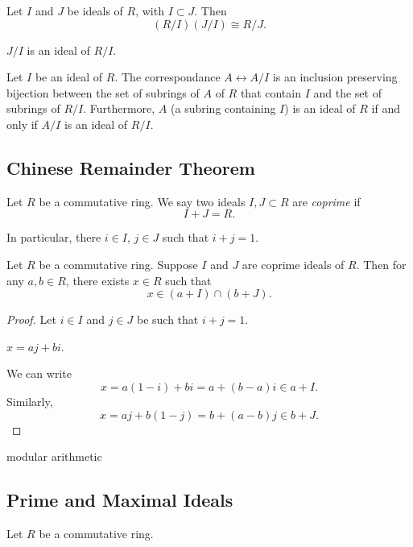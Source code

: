 \begin{theorem}
Let $I$ and $J$ be ideals of $R$, with $I\subset J$. Then
\begin{equation}
(R/I)(J/I)\cong R/J.
\end{equation}
\end{theorem}

\begin{lemma*}
$J/I$ is an ideal of $R/I$.
\end{lemma*}

\begin{theorem}
Let $I$ be an ideal of $R$. The correspondance $A\leftrightarrow A/I$ is an inclusion preserving bijection between the set of subrings of $A$ of $R$ that contain $I$ and the set of subrings of $R/I$. Furthermore, $A$ (a subring containing $I$) is an ideal of $R$ if and only if $A/I$ is an ideal of $R/I$.
\end{theorem}

\subsection{Chinese Remainder Theorem}
\begin{definition}
Let $R$ be a commutative ring. We say two ideals $I,J\subset R$ are \emph{coprime} if
\[I+J=R.\]
\end{definition}

In particular, there $i\in I$, $j\in J$ such that $i+j=1$.

\begin{theorem}
Let $R$ be a commutative ring.
Suppose $I$ and $J$ are coprime ideals of $R$. 
Then for any $a,b\in R$, there exists $x\in R$ such that
\[x\in(a+I)\cap(b+J).\]
\end{theorem}

\begin{proof}
Let $i\in I$ and $j\in J$ be such that $i+j=1$. 
\begin{claim}
$x=aj+bi$.
\end{claim}
We can write
\[x=a(1-i)+bi=a+(b-a)i\in a+I.\]
Similarly,
\[x=aj+b(1-j)=b+(a-b)j\in b+J.\]
\end{proof}

modular arithmetic

\subsection{Prime and Maximal Ideals}
Let $R$ be a commutative ring.

